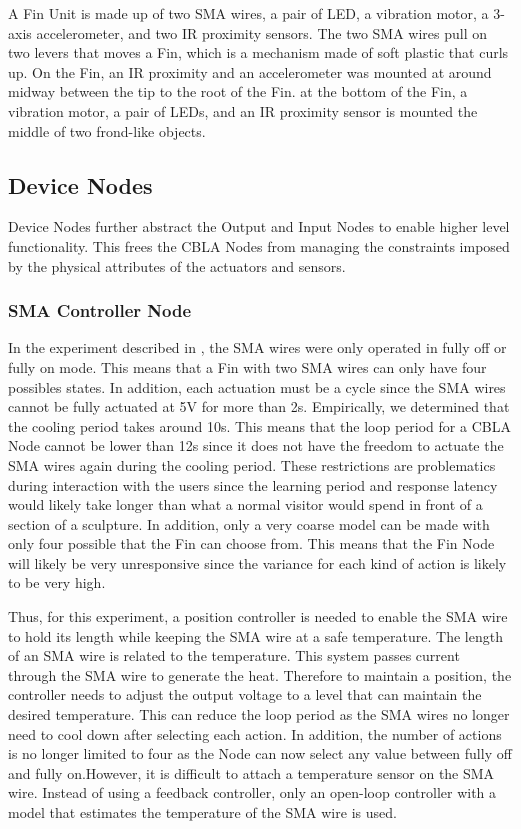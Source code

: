 A Fin Unit is made up of two SMA wires, a pair of LED, a vibration motor, a 3-axis accelerometer, and two IR proximity sensors. The two SMA wires pull on two levers that moves a Fin, which is a mechanism made of soft plastic that curls up. On the Fin, an IR proximity and an accelerometer was mounted at around midway between the tip to the root of the Fin. at the bottom of the Fin, a vibration motor, a pair of LEDs, and an IR proximity sensor is mounted the middle of two frond-like objects. 

\subsection{Device Nodes}

Device Nodes further abstract the Output and Input Nodes to enable higher level functionality. This frees the CBLA Nodes from managing the constraints imposed by the physical attributes of the actuators and sensors. 

\subsubsection{SMA Controller Node}

In the experiment described in , the SMA wires were only operated in fully off or fully on mode. This means that a Fin with two SMA wires can only have four possibles states. In addition, each actuation must be a cycle since the SMA wires cannot be fully actuated at 5V for more than 2s. Empirically, we determined that the cooling period takes around 10s. This means that the loop period for a CBLA Node cannot be lower than 12s since it does not have the freedom to actuate the SMA wires again during the cooling period. These restrictions are problematics during interaction with the users since the learning period and response latency would likely take longer than what a normal visitor would spend in front of a section of a sculpture. In addition, only a very coarse model can be made with only four possible that the Fin can choose from. This means that the Fin Node will likely be very unresponsive since the variance for each kind of action is likely to be very high.

Thus, for this experiment, a position controller is needed to enable the SMA wire to hold its length while keeping the SMA wire at a safe temperature. The length of an SMA wire is related to the temperature. This system passes current through the SMA wire to generate the heat. Therefore to maintain a position, the controller needs to adjust the output voltage to a level that can maintain the desired temperature. This can reduce the loop period as the SMA wires no longer need to cool down after selecting each action. In addition, the number of actions is no longer limited to four as the Node can now select any value between fully off and fully on.However, it is difficult to attach a temperature sensor on the SMA wire. Instead of using a feedback controller, only an open-loop controller with a model that estimates the temperature of the SMA wire is used.

